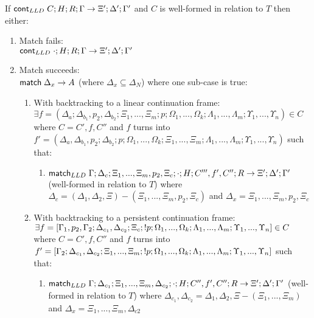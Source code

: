 \begin{lemma}
If $\mathsf{cont}_{LLD} \; C; H; R; \Gamma \rightarrow \Xi'; \Delta'; \Gamma'$ and $C$ is well-formed in relation to $T$ then either:

\begin{enumerate}
   \item Match fails: \\ $\mathsf{cont}_{LLD} \; \cdot; H; R; \Gamma \rightarrow \Xi'; \Delta'; \Gamma'$
   \item Match succeeds: \\ $\mathsf{match} \; \Delta_x \rightarrow A$ (where $\Delta_x \subseteq \Delta_N$) where one sub-case is true:
   \begin{enumerate}
      \item With backtracking to a linear continuation frame: \\ $\exists f = (\Delta_a; \Delta_{b_1}, p_2, \Delta_{b_2}; \Xi_1, ..., \Xi_m; p; \Omega_1, ..., \Omega_k; \Lambda_1, ..., \Lambda_m; \Upsilon_1, ..., \Upsilon_n) \in C$ where $C = C', f, C''$ and $f$ turns into $f' = (\Delta_a, \Delta_{b_1}, p_2; \Delta_{b_2}; p; \Omega_1, ..., \Omega_k; \Xi_1, ..., \Xi_m; \Lambda_1, ..., \Lambda_m; \Upsilon_1, ..., \Upsilon_n)$ such that:
      \begin{enumerate}
         \item $\mathsf{match}_{LLD} \; \Gamma; \Delta_c; \Xi_1, ..., \Xi_m, p_2, \Xi_c; \cdot; H; C''', f', C''; R \rightarrow \Xi'; \Delta'; \Gamma'$ (well-formed in relation to $T$) where $\Delta_c = (\Delta_1, \Delta_2, \Xi) - (\Xi_1, ..., \Xi_m, p_2, \Xi_c)$ and $\Delta_x = \Xi_1, ..., \Xi_m, p_2, \Xi_c$
      \end{enumerate}
      \item With backtracking to a persistent continuation frame: \\$\exists f = [\Gamma_1, p_2, \Gamma_2; \Delta_{c_1}, \Delta_{c_2}; \Xi_c; {!} p; \Omega_1, ..., \Omega_k; \Lambda_1, ..., \Lambda_m; \Upsilon_1, ..., \Upsilon_n] \in C$ where $C = C', f, C''$ and $f$ turns into $f' = [\Gamma_2; \Delta_{c_1}, \Delta_{c_2}; \Xi_1, ..., \Xi_m; {!} p; \Omega_1, ..., \Omega_k; \Lambda_1, ..., \Lambda_m; \Upsilon_1, ..., \Upsilon_n]$ such that:
      \begin{enumerate}
         \item $\mathsf{match}_{LLD} \; \Gamma; \Delta_{c_1}; \Xi_1, ..., \Xi_m, \Delta_{c_2}; \cdot; H; C'', f', C''; R \rightarrow \Xi'; \Delta'; \Gamma'$ (well-formed in relation to $T$) where $\Delta_{c_1}, \Delta_{c_2} = \Delta_1, \Delta_2, \Xi - (\Xi_1, ..., \Xi_m)$ and $\Delta_x = \Xi_1, ..., \Xi_m, \Delta_{c2}$
      \end{enumerate}
   \end{enumerate}
\end{enumerate}
\end{lemma}

